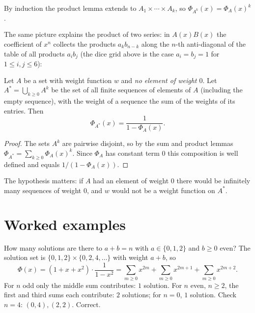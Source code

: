 By induction the product lemma extends to $A_1 \times \cdots \times A_k$, so
$\Phi_{A^k}(x) = \Phi_A(x)^k$.

The same picture explains the product of two series: in $A(x)B(x)$ the coefficient of $x^n$
collects the products $a_kb_{n-k}$ along the $n$-th anti-diagonal of the table of all
products $a_ib_j$ (the dice grid above is the case $a_i = b_j = 1$ for $1\le i,j\le 6$):
\begin{center}
\end{center}

\begin{lemma}
Let $A$ be a set with weight function $w$ and \emph{no element of weight $0$}. Let
$A^* = \bigcup_{k\ge 0} A^k$ be the set of all finite sequences of elements of $A$ (including the
empty sequence), with the weight of a sequence the sum of the weights of its entries. Then
\[
\Phi_{A^*}(x) = \frac{1}{1 - \Phi_A(x)}.
\]
\end{lemma}
\begin{proof}
The sets $A^k$ are pairwise disjoint, so by the sum and product lemmas
$\Phi_{A^*} = \sum_{k \ge 0} \Phi_A(x)^k$. Since $\Phi_A$ has constant term $0$ this composition
is well defined and equals $1/(1 - \Phi_A(x))$.
\end{proof}

The hypothesis matters: if $A$ had an element of weight $0$ there would be infinitely many
sequences of weight $0$, and $w$ would not be a weight function on $A^*$.

\section{Worked examples}

\begin{example}
How many solutions are there to $a + b = n$ with $a \in \{0,1,2\}$ and $b \ge 0$ even?
The solution set is $\{0,1,2\} \times \{0,2,4,\dots\}$ with weight $a + b$, so
\[
\Phi(x) = (1 + x + x^2)\cdot\frac{1}{1-x^2}
= \sum_{m\ge0} x^{2m} + \sum_{m\ge0}x^{2m+1} + \sum_{m\ge0} x^{2m+2}.
\]
For $n$ odd only the middle sum contributes: $1$ solution. For $n$ even, $n \ge 2$, the first and
third sums each contribute: $2$ solutions; for $n = 0$, $1$ solution. Check $n=4$:
$(0,4), (2,2)$. Correct.
\end{example}

